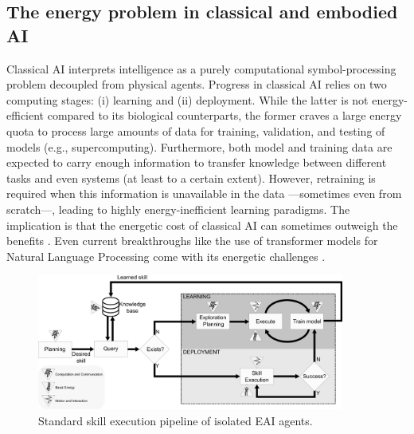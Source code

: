 \subsection{The energy problem in classical and embodied AI}
Classical AI interprets intelligence as a purely computational symbol-processing problem decoupled from physical agents. Progress in classical AI relies on two computing stages: (i) learning and (ii) deployment. While the latter is not energy-efficient compared to its biological counterparts, the former craves a large energy quota to process large amounts of data for training, validation, and testing of models (e.g., supercomputing). Furthermore, both model and training data are expected to carry enough information to transfer knowledge between different tasks and even systems (at least to a certain extent). However, retraining is required when this information is unavailable in the data ---sometimes even from scratch---, leading to highly energy-inefficient learning paradigms. The implication is that the energetic cost of classical AI can sometimes outweigh the benefits \cite{Strubell2019EnergyPolicyConsiderations}. Even current breakthroughs like the use of transformer models for Natural Language Processing come with its energetic challenges \cite{Cao2020TowardsAccurateReliable}.
\begin{figure}[!ht]
	\centering
	\includegraphics[width=0.9\textwidth]{fig/embodied_ai_learning_pipeline_v7.png}
	\caption{Standard skill execution pipeline of isolated EAI agents.}
	\label{fig:embodied_ai_pipeline}
\end{figure}
